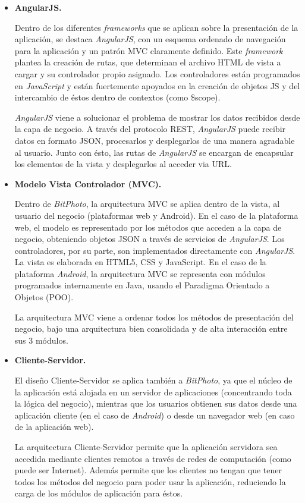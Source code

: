 \documentclass{memoria}
\begin{document}
\begin{itemize}

\item \textbf{AngularJS.}

Dentro de los diferentes \textsl{frameworks} que se aplican sobre la presentación de la aplicación, se destaca \textsl{AngularJS}, con un esquema ordenado de navegación para la aplicación y un patrón MVC claramente definido. Este \textsl{framework} plantea la creación de rutas, que determinan el archivo HTML de vista a cargar y su controlador propio asignado. Los controladores están programados en \textsl{JavaScript} y están fuertemente apoyados en la creación de objetos JS y del intercambio de éstos dentro de contextos (como \$scope).

\textsl{AngularJS} viene a solucionar el problema de mostrar los datos recibidos desde la capa de negocio. A través del protocolo REST, \textsl{AngularJS} puede recibir datos en formato JSON, procesarlos y desplegarlos de una manera agradable al usuario. Junto con ésto, las rutas de \textsl{AngularJS} se encargan de encapsular los elementos de la vista y desplegarlos al acceder via URL.
\end{itemize}


\begin{itemize}
\item \textbf{Modelo Vista Controlador (MVC).}

Dentro de \textsl{BitPhoto}, la arquitectura MVC se aplica dentro de la vista, al usuario del negocio (plataformas web y Android). En el caso de la plataforma web, el modelo es representado por los métodos que acceden a la capa de negocio, obteniendo objetos JSON a través de servicios de \textsl{AngularJS}. Los controladores, por su parte, son implementados directamente con \textsl{AngularJS}. La vista es elaborada en HTML5, CSS y JavaScript. En el caso de la plataforma \textsl{Android}, la arquitectura MVC se representa con módulos programados internamente en Java, usando el Paradigma Orientado a Objetos (POO).

La arquitectura MVC viene a ordenar todos los métodos de presentación del negocio, bajo una arquitectura bien consolidada y de alta interacción entre sus 3 módulos.

\item \textbf{Cliente-Servidor.}

El diseño Cliente-Servidor se aplica también a \textsl{BitPhoto}, ya que el núcleo de la aplicación está alojada en un servidor de aplicaciones (concentrando toda la lógica del negocio), mientras que los usuarios obtienen sus datos desde una aplicación cliente (en el caso de \textsl{Android}) o desde un navegador web (en caso de la aplicación web).

La arquitectura Cliente-Servidor permite que la aplicación servidora sea accedida mediante clientes remotos a través de redes de computación (como puede ser Internet). Además permite que los clientes no tengan que tener todos los métodos del negocio para poder usar la aplicación, reduciendo la carga de los módulos de aplicación para éstos.

\end{itemize}
\end{document}
